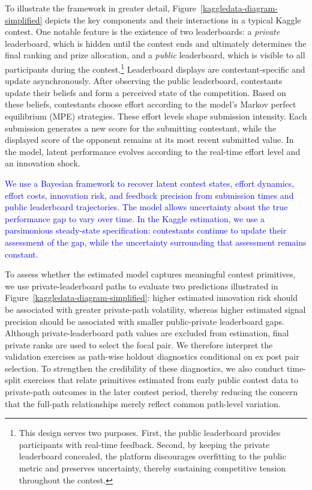 \documentclass[mnsc]{informs3}
\begin{document}
To illustrate the framework in greater detail, Figure~\ref{kaggledata-diagram-simplified} depicts the key components and their interactions in a typical Kaggle contest.
One notable feature is the existence of two leaderboards: a \textit{private} leaderboard, which is hidden until the contest ends and ultimately determines the final ranking and prize allocation, and a \textit{public} leaderboard, which is visible to all participants during the contest.\footnote{
This design serves two purposes.
First, the public leaderboard provides participants with real-time feedback.
Second, by keeping the private leaderboard concealed, the platform discourages overfitting to the public metric and preserves uncertainty, thereby sustaining competitive tension throughout the contest.
}
Leaderboard displays are contestant-specific and update asynchronously.
After observing the public leaderboard, contestants update their beliefs and form a perceived state of the competition.
Based on these beliefs, contestants choose effort according to the model’s Markov perfect equilibrium (MPE) strategies.
These effort levels shape submission intensity. 
Each submission generates a new score for the submitting contestant, while the displayed score of the opponent remains at its most recent submitted value.
In the model, latent performance evolves according to the real-time effort level and an innovation shock.


\textcolor{blue}{We use a Bayesian framework to recover latent contest states, effort dynamics, effort costs, innovation risk, and feedback precision from submission times and public leaderboard trajectories. The model allows uncertainty about the true performance gap to vary over time. In the Kaggle estimation, we use a parsimonious steady-state specification: contestants continue to update their assessment of the gap, while the uncertainty surrounding that assessment remains constant.}


To assess whether the estimated model captures meaningful contest primitives, we use private-leaderboard paths to evaluate two predictions illustrated in Figure~\ref{kaggledata-diagram-simplified}: 
higher estimated innovation risk should be associated with greater private-path volatility, 
whereas higher estimated signal precision should be associated with smaller public-private leaderboard gaps. 
Although private-leaderboard path values are excluded from estimation, final private ranks are used to select the focal pair. We therefore interpret the validation exercises as path-wise holdout diagnostics conditional on ex post pair selection.
To strengthen the credibility of these diagnostics, we also conduct time-split exercises that relate primitives estimated from early public contest data to private-path outcomes in the later contest period, thereby reducing the concern that the full-path relationships merely reflect common path-level variation.
\end{document}
